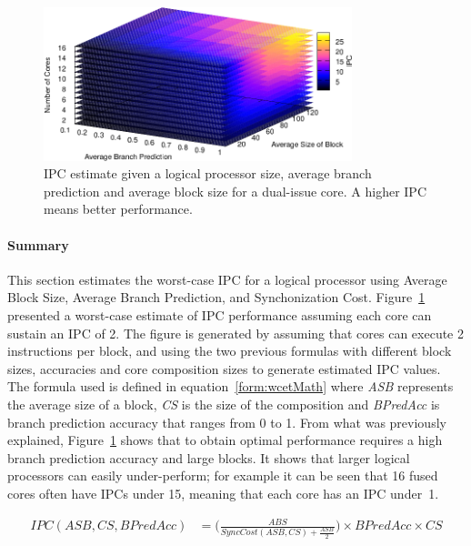 \begin{figure}[t]
    \centering
    \includegraphics[width=0.8\textwidth]{cases-paper/graphics/limit_study/summary.pdf}
    \caption{IPC estimate given a logical processor size, average branch prediction and average block size for a dual-issue core. A higher IPC means better performance.}
    \label{fig:lm_summ}
\vspace{5mm}
\end{figure}



\paragraph{Summary}

This section estimates the worst-case IPC for a logical processor using Average Block Size, Average Branch Prediction, and Synchonization Cost.
Figure~\ref{fig:lm_summ} presented a worst-case estimate of IPC performance assuming each core can sustain an IPC of 2.
The figure is generated by assuming that cores can execute 2 instructions per block, and using the two previous formulas with different block sizes, accuracies and core composition sizes to generate estimated IPC values.
The formula used is defined in equation~\ref{form:wcetMath} where \textit{ASB} represents the average size of a block, \textit{CS} is the size of the composition and \textit{BPredAcc} is branch prediction accuracy that ranges from 0 to 1.
From what was previously explained, Figure~\ref{fig:lm_summ} shows that to obtain optimal performance requires a high branch prediction accuracy and large blocks.
It shows that larger logical processors can easily under-perform; for example it can be seen that 16 fused cores often have IPCs under 15, meaning that each core has an IPC under~1.


\begin{align}\label{form:wcetMath}
IPC(ASB,CS,BPredAcc) &= \bigg(\frac{ABS}{SyncCost(ASB,CS) + {\frac{ASB}{2}}}\bigg) \times BPredAcc \times CS
\end{align}

